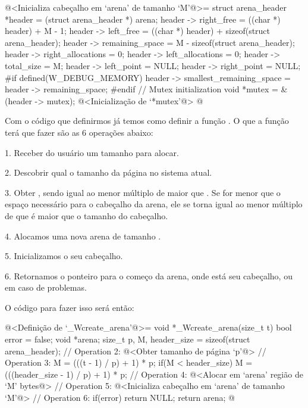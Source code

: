 \iniciocodigo
@<Inicializa cabeçalho em `arena' de tamanho `M'@>=
{
  struct arena_header *header = (struct arena_header *) arena;
  header -> right_free = ((char *) header) + M - 1;
  header -> left_free = ((char *) header) + sizeof(struct arena_header);
  header -> remaining_space = M - sizeof(struct arena_header);
  header -> right_allocations = 0;
  header -> left_allocations = 0;
  header -> total_size = M;
  header -> left_point = NULL;
  header -> right_point = NULL;
#if defined(W_DEBUG_MEMORY)
  header ->  smallest_remaining_space = header -> remaining_space;
#endif
  { // Mutex initialization
    void *mutex = &(header -> mutex);
    @<Inicialização de `*mutex'@>
  }
}
@
\fimcodigo


Com o código que definirmos já temos como definir a
função . O que a função terá que fazer
são as 6 operações abaixo:

1. Receber do usuário um tamanho  para alocar.

2. Descobrir qual o tamanho da página  no sistema atual.

3. Obter , sendo igual ao menor múltiplo
de  maior que . Se  for
menor que o espaço necessário para o cabeçalho da arena, ele se torna
igual ao menor múltiplo de  que é maior que o tamanho do
cabeçalho.

4. Alocamos uma nova arena de tamanho .

5. Inicializamos o seu cabeçalho.

6. Retornamos o ponteiro para o começo da arena, onde está seu cabeçalho,
ou  em caso de problemas.

O código para fazer isso será então:

\iniciocodigo
@<Definição de `\_Wcreate\_arena'@>=
void *_Wcreate_arena(size_t t){
  bool error = false;
  void *arena;
  size_t p, M, header_size = sizeof(struct arena_header);
  // Operation 2:
  @<Obter tamanho de página `p'@>
  // Operation 3:
  M = (((t - 1) / p) + 1) * p;
  if(M < header_size)
    M = (((header_size - 1) / p) + 1) * p;
  // Operation 4:
  @<Alocar em `arena' região de `M' bytes@>
  // Operation 5:
  @<Inicializa cabeçalho em `arena' de tamanho `M'@>
  // Operation 6:
  if(error) return NULL;
  return arena;
}
@
\fimcodigo


